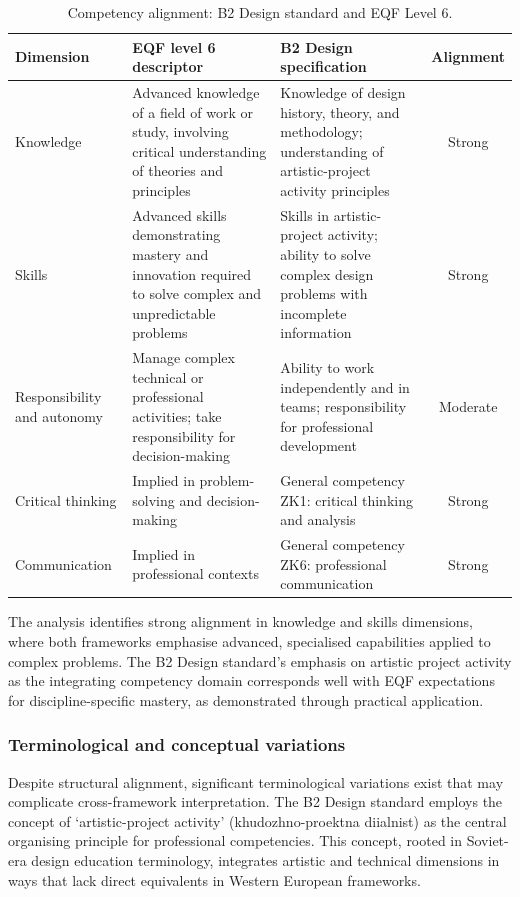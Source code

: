 \documentclass[ed]{acnsart}
\begin{document}
	\begin{table}[htbp]
		\centering
		\caption{Competency alignment: B2 Design standard and EQF Level 6.}
		\label{tab:competency-alignment}
		\small
		\begin{tabularx}{\textwidth}{@{}p{2.5cm}XXc@{}}
			\toprule
			\hfil \textbf{Dimension} & \hfil \textbf{EQF level 6 descriptor} & \hfil \textbf{B2 Design specification} & \textbf{Alignment} \\
			\midrule
			Knowledge & Advanced knowledge of a field of work or study, involving critical understanding of theories and principles & Knowledge of design history, theory, and methodology; understanding of artistic-project activity principles & Strong \\
			\addlinespace
			Skills & Advanced skills demonstrating mastery and innovation required to solve complex and unpredictable problems & Skills in artistic-project activity; ability to solve complex design problems with incomplete information & Strong \\
			\addlinespace
			Responsibility and autonomy & Manage complex technical or professional activities; take responsibility for decision-making & Ability to work independently and in teams; responsibility for professional development & Moderate \\
			\addlinespace
			Critical thinking & Implied in problem-solving and decision-making & General competency ZK1: critical thinking and analysis & Strong \\
			\addlinespace
			Communication & Implied in professional contexts & General competency ZK6: professional communication & Strong \\
			\bottomrule
		\end{tabularx}
	\end{table}
	
	The analysis identifies strong alignment in knowledge and skills dimensions, where both frameworks emphasise advanced, specialised capabilities applied to complex problems. The B2 Design standard's emphasis on artistic project activity as the integrating competency domain corresponds well with EQF expectations for discipline-specific mastery, as demonstrated through practical application.
	
	\subsubsection{Terminological and conceptual variations}
	
	Despite structural alignment, significant terminological variations exist that may complicate cross-framework interpretation. The B2 Design standard employs the concept of `artistic-project activity' (khudozhno-proektna diialnist) as the central organising principle for professional competencies. This concept, rooted in Soviet-era design education terminology, integrates artistic and technical dimensions in ways that lack direct equivalents in Western European frameworks.
	
\end{document}

